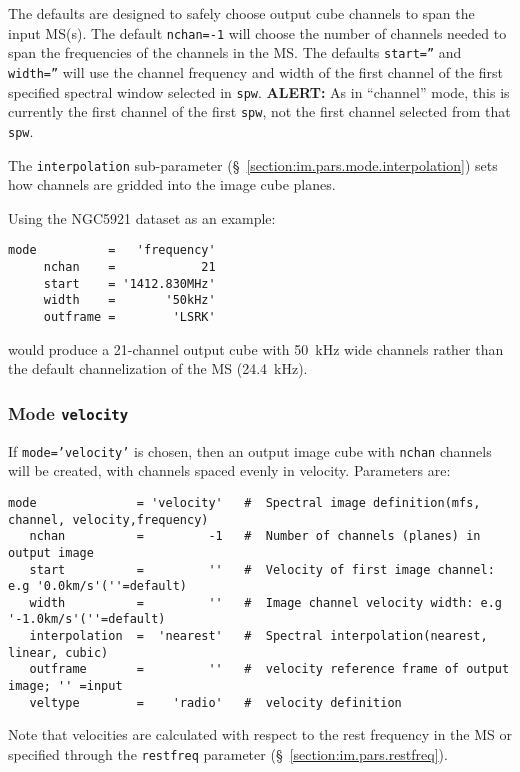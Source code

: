 The defaults are designed to safely choose output cube channels to
span the input MS(s).
The default {\tt nchan=-1} will choose the number of channels needed
to span the frequencies of the channels in the MS.  
The defaults {\tt start=''} and {\tt width=''} will use the channel
frequency and width of the first channel of the first specified
spectral window selected in {\tt spw}.  {\bf ALERT:} As in ``channel''
mode, this is currently the first channel of the first {\tt spw}, not
the first channel selected from that {\tt spw}.  

The {\tt interpolation} sub-parameter
(\S~\ref{section:im.pars.mode.interpolation}) sets how channels are
gridded into the image cube planes.

Using the NGC5921 dataset as an example:
\small
\begin{verbatim}
mode          =   'frequency'       
     nchan    =            21        
     start    = '1412.830MHz'     
     width    =       '50kHz'        
     outframe =        'LSRK'
\end{verbatim}
\normalsize
would produce a 21-channel output cube with 50~kHz wide channels
rather than the default channelization of the MS (24.4~kHz).


\subsubsection{Mode {\tt velocity} }
\label{section:im.pars.mode.velocity}

If {\tt mode='velocity'} is chosen, then an output image cube
with {\tt nchan} channels will be created, with channels spaced
evenly in velocity.  Parameters are:
\small
\begin{verbatim}
mode              = 'velocity'   #  Spectral image definition(mfs, channel, velocity,frequency)
   nchan          =         -1   #  Number of channels (planes) in output image
   start          =         ''   #  Velocity of first image channel: e.g '0.0km/s'(''=default)
   width          =         ''   #  Image channel velocity width: e.g '-1.0km/s'(''=default)
   interpolation  =  'nearest'   #  Spectral interpolation(nearest, linear, cubic)
   outframe       =         ''   #  velocity reference frame of output image; '' =input
   veltype        =    'radio'   #  velocity definition
\end{verbatim}
\normalsize
Note that velocities are calculated with respect to the rest frequency
in the MS or specified through the {\tt restfreq} parameter
(\S~\ref{section:im.pars.restfreq}).

